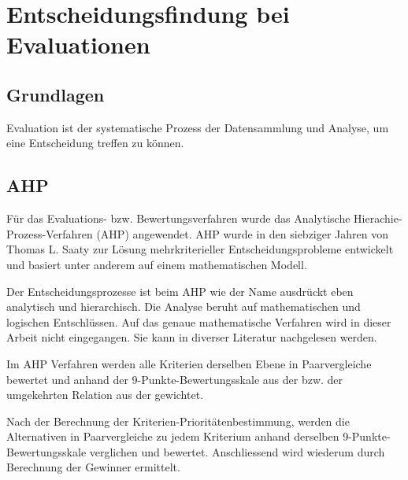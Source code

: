 
\cleardoublepage
\chapter{Entscheidungsfindung bei Evaluationen}\label{kab:Entscheidungsfindung}
\section{Grundlagen}
Evaluation ist der systematische Prozess der Datensammlung und Analyse, um eine Entscheidung treffen zu können.
\section{AHP}
Für das Evaluations- bzw. Bewertungsverfahren wurde das Analytische Hierachie-Prozess-Verfahren (AHP) angewendet. AHP wurde in den siebziger Jahren von Thomas L. Saaty zur Lösung mehrkriterieller Entscheidungsprobleme entwickelt und basiert unter anderem auf einem mathematischen Modell.
\cite{Reichardt2003}

Der Entscheidungsprozesse ist beim AHP wie der Name ausdrückt eben analytisch und hierarchisch. Die Analyse beruht auf mathematischen und logischen Entschlüssen. Auf das genaue mathematische Verfahren wird in dieser Arbeit nicht eingegangen. Sie kann in diverser Literatur nachgelesen werden. \cite{Reichardt2003}

Im AHP Verfahren werden alle Kriterien derselben Ebene in Paarvergleiche bewertet und anhand der 9-Punkte-Bewertungsskale aus der  bzw. der umgekehrten Relation aus der  gewichtet.

Nach der Berechnung der Kriterien-Prioritätenbestimmung, werden die Alternativen in Paarvergleiche zu jedem Kriterium anhand derselben 9-Punkte-Bewertungsskale verglichen und bewertet. Anschliessend wird wiederum durch Berechnung der Gewinner ermittelt.

